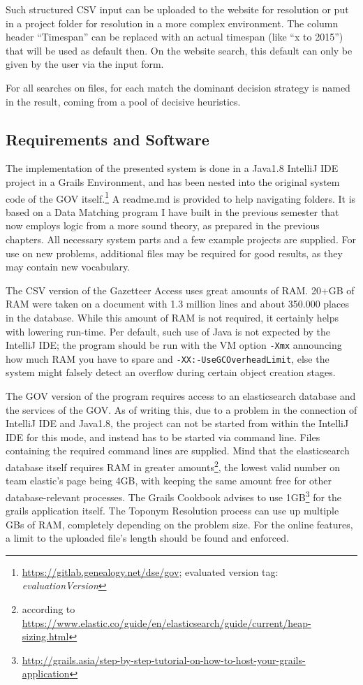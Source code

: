\documentclass[11pt]{article}
\begin{document}
Such structured CSV input can be uploaded to the website for resolution or put in a project folder for resolution in a more complex environment. The column header ``Timespan'' can be replaced with an actual timespan (like ``x to 2015'') that will be used as default then. On the website search, this default can only be given by the user via the input form.

For all searches on files, for each match the dominant decision strategy is named in the result, coming from a pool of decisive heuristics.

\subsection{Requirements and Software}

The implementation of the presented system is done in a Java1.8 IntelliJ IDE project in a Grails Environment, and has been nested into the original system code of the GOV itself.\footnote{\url{https://gitlab.genealogy.net/dse/gov}; evaluated version tag: \emph{evaluationVersion}} A readme.md is provided to help navigating folders. It is based on a Data Matching program I have built in the previous semester that now employs logic from a more sound theory, as prepared in the previous chapters. All necessary system parts and a few example projects are supplied. For use on new problems, additional files may be required for good results, as they may contain new vocabulary.

The CSV version of the Gazetteer Access uses great amounts of RAM. 20+GB of RAM were taken on a document with 1.3 million lines and about 350.000 places in the database. While this amount of RAM is not required, it certainly helps with lowering run-time. Per default, such use of Java is not expected by the IntelliJ IDE; the program should be run with the VM option \texttt{-Xmx} announcing how much RAM you have to spare and \texttt{-XX:-UseGCOverheadLimit}, else the system might falsely detect an overflow during certain object creation stages.

The GOV version of the program requires access to an elasticsearch database and the services of the GOV. As of writing this, due to a problem in the connection of IntelliJ IDE and Java1.8, the project can not be started from within the IntelliJ IDE for this mode, and instead has to be started via command line. Files containing the required command lines are supplied. Mind that the elasticsearch database itself requires RAM in greater amounts\footnote{according to \url{https://www.elastic.co/guide/en/elasticsearch/guide/current/heap-sizing.html}}, the lowest valid number on team elastic's page being 4GB, with keeping the same amount free for other database-relevant processes. The Grails Cookbook advises to use 1GB\footnote{\url{http://grails.asia/step-by-step-tutorial-on-how-to-host-your-grails-application}} for the grails application itself. The Toponym Resolution process can use up multiple GBs of RAM, completely depending on the problem size. For the online features, a limit to the uploaded file's length should be found and enforced.
\end{document}
